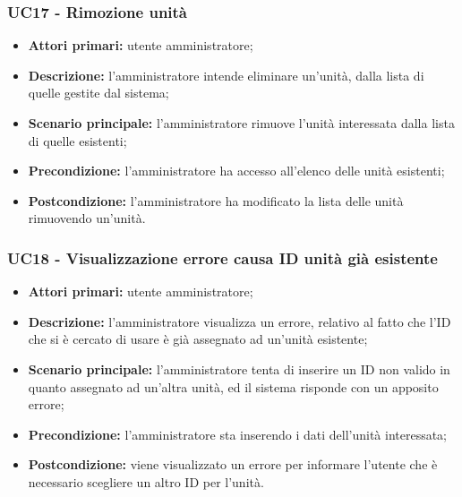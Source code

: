 \subsubsection{UC17 - Rimozione unità}
	\begin{itemize}
		\item \textbf{Attori primari:} utente amministratore;
		\item \textbf{Descrizione:} l'amministratore intende eliminare un'unità, dalla lista di quelle gestite dal sistema;
		\item \textbf{Scenario principale:} l'amministratore rimuove l'unità interessata dalla lista di quelle esistenti;
		\item \textbf{Precondizione:} l'amministratore ha accesso all'elenco delle unità esistenti;
		\item \textbf{Postcondizione:} l'amministratore ha modificato la lista delle unità rimuovendo un'unità.
	\end{itemize}

\subsubsection{UC18 - Visualizzazione errore causa ID unità già esistente}
	\begin{itemize}
		\item \textbf{Attori primari:} utente amministratore;
		\item \textbf{Descrizione:} l'amministratore visualizza un errore, relativo al fatto che l'ID che si è cercato di usare è già assegnato ad un'unità esistente;
		\item \textbf{Scenario principale:} l'amministratore tenta di inserire un ID non valido in quanto assegnato ad un'altra unità, ed il sistema risponde con un apposito errore;
		\item \textbf{Precondizione:} l'amministratore sta inserendo i dati dell'unità interessata;
		\item \textbf{Postcondizione:} viene visualizzato un errore per informare l'utente che è necessario scegliere un altro ID per l'unità.
	\end{itemize}